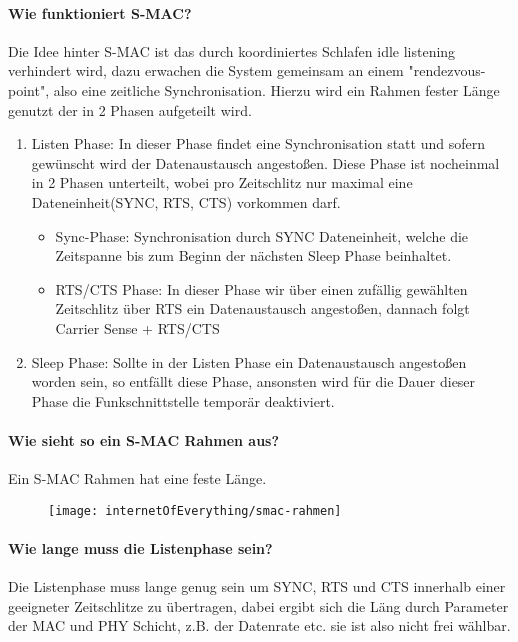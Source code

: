 	\paragraph{Wie funktioniert S-MAC?} 
	Die Idee hinter S-MAC ist das durch koordiniertes Schlafen idle listening verhindert wird, dazu erwachen die System gemeinsam an einem "rendezvous-point", also eine zeitliche Synchronisation.
	Hierzu wird ein Rahmen fester Länge genutzt der in 2 Phasen aufgeteilt wird.
	\begin{enumerate}
		\item Listen Phase: In dieser Phase findet eine Synchronisation statt und sofern gewünscht wird der Datenaustausch angestoßen. Diese Phase ist nocheinmal in 2 Phasen unterteilt, wobei pro Zeitschlitz nur maximal eine Dateneinheit(SYNC, RTS, CTS) vorkommen darf.
		\begin{itemize}
			\item Sync-Phase: Synchronisation durch SYNC Dateneinheit, welche die Zeitspanne bis zum Beginn der nächsten Sleep Phase beinhaltet.
			\item RTS/CTS Phase: In dieser Phase wir über einen zufällig gewählten Zeitschlitz über RTS ein Datenaustausch angestoßen, dannach folgt Carrier Sense + RTS/CTS 
		\end{itemize}
		\item Sleep Phase: Sollte in der Listen Phase ein Datenaustausch angestoßen worden sein, so entfällt diese Phase, ansonsten wird für die Dauer dieser Phase die Funkschnittstelle temporär deaktiviert.
	\end{enumerate}
	
	\paragraph{Wie sieht so ein S-MAC Rahmen aus?}
	Ein S-MAC Rahmen hat eine feste Länge.
	
	\begin{figure}[H]
	\centering
	\texttt{[image: internetOfEverything/smac-rahmen]}
	\end{figure}
	
	\paragraph{Wie lange muss die Listenphase sein?}
	Die Listenphase muss lange genug sein um SYNC, RTS und CTS innerhalb einer geeigneter Zeitschlitze zu übertragen, dabei ergibt sich die Läng durch Parameter der MAC und PHY Schicht, z.B. der Datenrate etc. sie ist also nicht frei wählbar.
	

